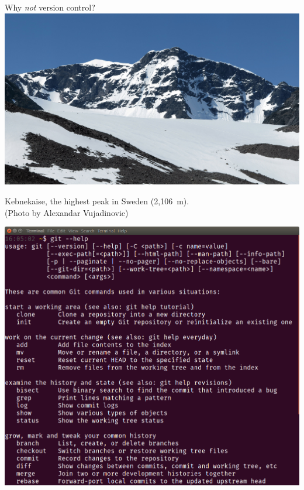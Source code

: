 \documentclass{beamer}
\newcommand\nt[1]{\textcolor{labss_bg}{#1}}
\begin{document}
\begin{frame}{Why \emph{not} version control?}
  \centering
  \includegraphics[width=\textwidth]{Kebnekaise.jpg}

  Kebnekaise, the highest peak in Sweden (2,106~m).\\
  \nt{\footnotesize (Photo by Alexandar Vujadinovic)}
\end{frame}

\begin{frame}
  \centering
  \includegraphics[height=\textheight]{githelp}
\end{frame}
\end{document}

